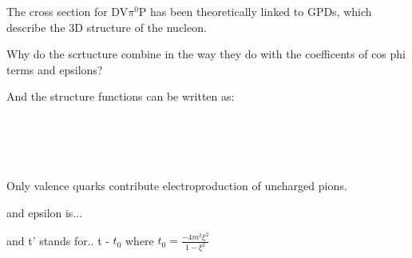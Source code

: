     The cross section for DV$\pi^0$P has been theoretically linked to GPDs, which describe the 3D structure of the nucleon.


    
    Why do the scrtucture combine in the way they do with the coefficents of cos phi terms and epsilons?
    
    And the structure functions can be written as:

    \\
    
    \\
    
    \\
    
    \\
    
    Only valence quarks contribute electroproduction
of uncharged pions.

    and epsilon is... 
    
    
    and t' stands for.. t - $t_0$ where $t_0 = \frac{-4m^2\xi^2}{1-\xi^2}$
    
